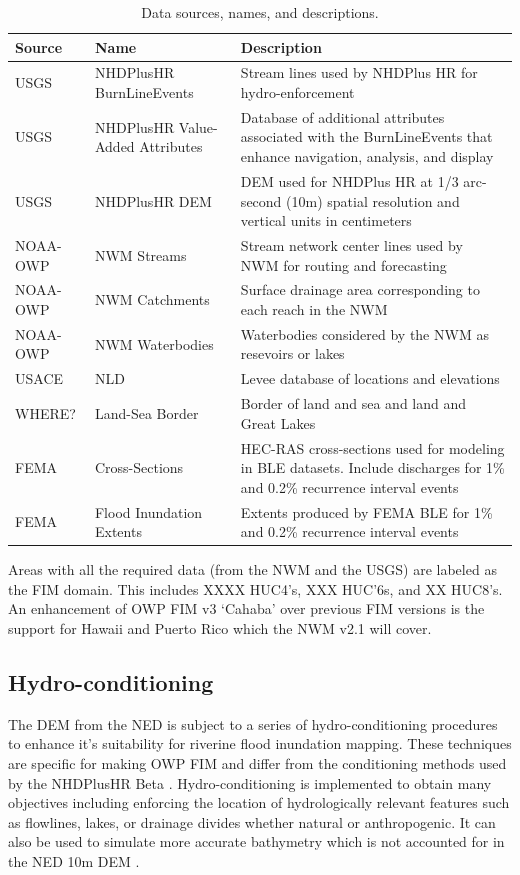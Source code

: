 \begin{table}
\caption{Data sources, names, and descriptions.}
\label{tab:data}
\centering
\begin{tabular}{|p{2cm}|p{4cm}|p{8cm}|}
\hline
Source & Name & Description \\
\hline
USGS & NHDPlusHR BurnLineEvents & Stream lines used by NHDPlus HR for hydro-enforcement \\
\hline
USGS & NHDPlusHR Value-Added Attributes & Database of additional attributes associated with the BurnLineEvents that enhance navigation, analysis, and display \\
\hline
USGS & NHDPlusHR DEM & DEM used for NHDPlus HR at 1/3 arc-second (10m) spatial resolution and vertical units in centimeters \\
\hline
NOAA-OWP & NWM Streams & Stream network center lines used by NWM for routing and forecasting \\
\hline
NOAA-OWP & NWM Catchments & Surface drainage area corresponding to each reach in the NWM \\
\hline
NOAA-OWP & NWM Waterbodies & Waterbodies considered by the NWM as resevoirs or lakes \\
\hline
USACE & NLD & Levee database of locations and elevations  \\
\hline
WHERE? & Land-Sea Border & Border of land and sea and land and Great Lakes \\
\hline
FEMA & Cross-Sections & HEC-RAS cross-sections used for modeling in BLE datasets. Include discharges for 1\% and 0.2\% recurrence interval events \\
\hline
FEMA & Flood Inundation Extents & Extents produced by FEMA BLE for 1\% and 0.2\% recurrence interval events \\
\hline
\end{tabular}
\end{table}

Areas with all the required data (from the NWM and the USGS) are labeled as the FIM domain. 
 This includes XXXX HUC4's, XXX HUC'6s, and XX HUC8's.
An enhancement of OWP FIM v3 `Cahaba' over previous FIM versions is the support for Hawaii and Puerto Rico which the NWM v2.1 will cover.
%
\subsection{Hydro-conditioning}
\label{ssec:hydro_conditioning}
%
The DEM from the NED is subject to a series of hydro-conditioning procedures to enhance it's suitability for riverine flood inundation mapping. 
These techniques are specific for making OWP FIM and differ from the conditioning methods used by the NHDPlusHR Beta \cite{moore2019user}.
Hydro-conditioning is implemented to obtain many objectives including enforcing the location of hydrologically relevant features such as flowlines, lakes, or drainage divides whether natural or anthropogenic. 
It can also be used to simulate more accurate bathymetry which is not accounted for in the NED 10m DEM \cite{gesch2002national}.

